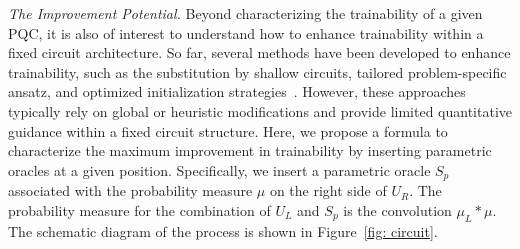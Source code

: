 \documentclass[%
 superscriptaddress,
 aps,prl,
 reprint,
 twocolumn,
 amsmath,amssymb,showpacs,
 bibnotes,
]{revtex4-2}
\begin{document}
\emph{The Improvement Potential.}
Beyond characterizing the trainability of a given PQC, it is also of interest to understand how to enhance trainability within a fixed circuit architecture. So far, several methods have been developed to enhance trainability, such as the substitution by shallow circuits, tailored problem-specific ansatz, and optimized initialization strategies~\cite{zhang2024absence,cerezo2021cost, liu2024mitigating, grant2019initialization,skolik2021layerwise,verdon2019learning}. However, these approaches typically rely on global or heuristic modifications and provide limited quantitative guidance within a fixed circuit structure. Here, we propose a formula to characterize the maximum improvement in trainability by inserting parametric oracles at a given position. Specifically, we insert a parametric oracle $S_p$ associated with the probability measure $\mu$ on the right side of $U_R$. The probability measure for the combination of $U_L$ and $S_p$ is the convolution $\mu_L * \mu$. The schematic diagram of the process is shown in Figure~\ref{fig: circuit}.
\end{document}
